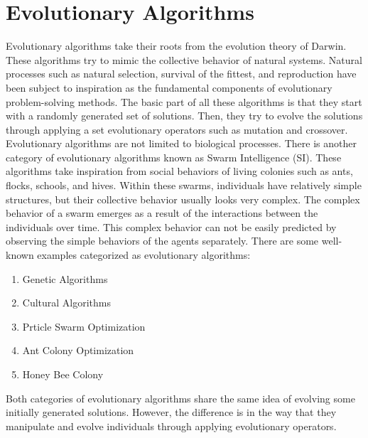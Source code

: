 \section{Evolutionary Algorithms}
Evolutionary algorithms take their roots from the evolution theory of Darwin. These algorithms try to mimic the collective behavior of natural systems. Natural processes such as natural selection, survival of the fittest, and reproduction have been subject to inspiration as the fundamental components of evolutionary problem-solving methods. The basic part of all these algorithms is that they start with a randomly generated set of solutions. Then, they try to evolve the solutions through applying a set evolutionary operators such as mutation and crossover. \newline
Evolutionary algorithms are not limited to biological processes. There is another category of evolutionary algorithms known as Swarm Intelligence (SI). These algorithms take inspiration from social behaviors of living colonies such as ants, flocks, schools, and hives. Within these swarms, individuals have relatively simple structures, but their collective behavior usually looks very complex. The complex behavior of a swarm emerges as a result of the interactions between the individuals over time. This complex behavior can not be easily predicted by observing the simple behaviors of the agents separately. \newline
There are some well-known examples categorized as evolutionary algorithms:
\begin{enumerate}
	\item Genetic Algorithms
	\item Cultural Algorithms
	\item Prticle Swarm Optimization
	\item Ant Colony Optimization
	\item Honey Bee Colony
\end{enumerate}
Both categories of evolutionary algorithms share the same idea of evolving some initially generated solutions. However, the difference is in the way that they manipulate and evolve individuals through applying evolutionary operators. 
